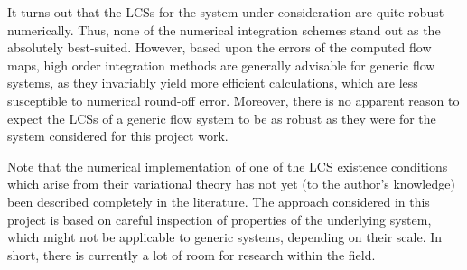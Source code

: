 It turns out that the LCSs for the system under consideration are quite robust
numerically. Thus, none of the numerical integration schemes stand out as the
absolutely best-suited. However, based upon the errors of the computed flow
maps, high order integration methods are generally advisable for generic flow
systems, as they invariably yield more efficient calculations, which are less
susceptible to numerical round-off error. Moreover, there is no apparent reason
to expect the LCSs of a generic flow system to be as robust as they were for the
system considered for this project work.

Note that the numerical implementation of one of the LCS existence conditions
which arise from their variational theory has not yet (to the author's
knowledge) been described completely in the literature.
The approach considered in this project is based on careful inspection
of properties of the underlying system, which might not be applicable to
generic systems, depending on their scale. In short, there is currently a
lot of room for research within the field.
